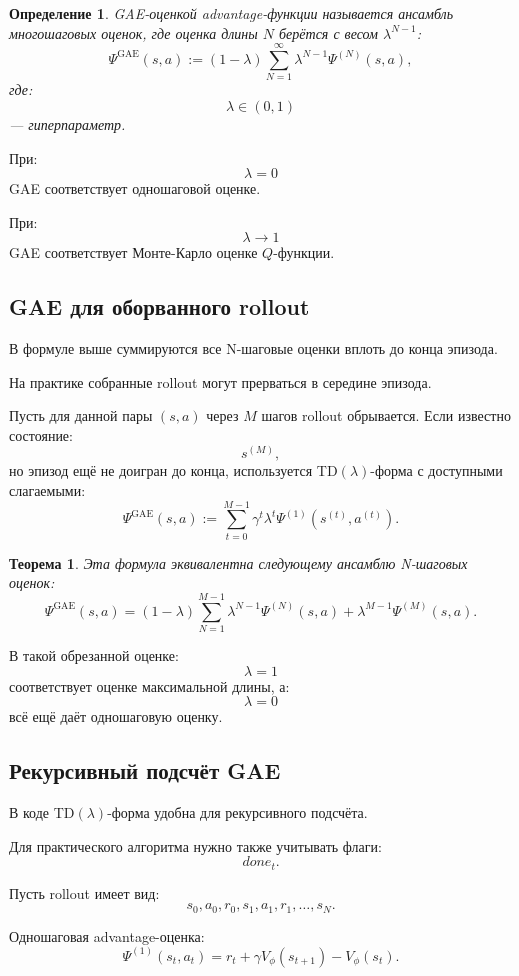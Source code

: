 \documentclass[12pt,a4paper]{article}
\newtheorem{theorem}{Теорема}
\newtheorem{definition}{Определение}
\begin{document}
\begin{definition}
GAE-оценкой advantage-функции называется ансамбль многошаговых оценок, где оценка длины $N$ берётся с весом $\lambda^{N-1}$:
\[
\Psi^{\mathrm{GAE}}(s,a)
:=
(1-\lambda)
\sum_{N=1}^{\infty}
\lambda^{N-1}
\Psi^{(N)}(s,a),
\]
где:
\[
\lambda\in(0,1)
\]
--- гиперпараметр.
\end{definition}

При:
\[
\lambda=0
\]
GAE соответствует одношаговой оценке.

При:
\[
\lambda\to 1
\]
GAE соответствует Монте-Карло оценке $Q$-функции.

\subsection{GAE для оборванного rollout}

В формуле выше суммируются все N-шаговые оценки вплоть до конца эпизода.

На практике собранные rollout могут прерваться в середине эпизода.

Пусть для данной пары $(s,a)$ через $M$ шагов rollout обрывается. Если известно состояние:
\[
s^{(M)},
\]
но эпизод ещё не доигран до конца, используется TD$(\lambda)$-форма с доступными слагаемыми:
\[
\Psi^{\mathrm{GAE}}(s,a)
:=
\sum_{t=0}^{M-1}
\gamma^t
\lambda^t
\Psi^{(1)}(s^{(t)},a^{(t)}).
\]

\begin{theorem}
Эта формула эквивалентна следующему ансамблю N-шаговых оценок:
\[
\Psi^{\mathrm{GAE}}(s,a)
=
(1-\lambda)
\sum_{N=1}^{M-1}
\lambda^{N-1}
\Psi^{(N)}(s,a)
+
\lambda^{M-1}
\Psi^{(M)}(s,a).
\]
\end{theorem}

В такой обрезанной оценке:
\[
\lambda=1
\]
соответствует оценке максимальной длины, а:
\[
\lambda=0
\]
всё ещё даёт одношаговую оценку.

\subsection{Рекурсивный подсчёт GAE}

В коде TD$(\lambda)$-форма удобна для рекурсивного подсчёта.

Для практического алгоритма нужно также учитывать флаги:
\[
done_t.
\]

Пусть rollout имеет вид:
\[
s_0,a_0,r_0,s_1,a_1,r_1,\ldots,s_N.
\]

Одношаговая advantage-оценка:
\[
\Psi^{(1)}(s_t,a_t)
=
r_t
+
\gamma
V_\phi(s_{t+1})
-
V_\phi(s_t).
\]
\end{document}
